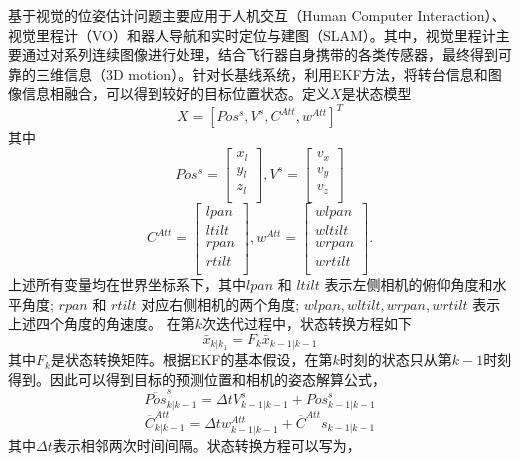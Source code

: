 基于视觉的位姿估计问题主要应用于人机交互（Human Computer Interaction）、视觉里程计（VO）和器人导航和实时定位与建图（SLAM）。其中，视觉里程计主要通过对系列连续图像进行处理，结合飞行器自身携带的各类传感器，最终得到可靠的三维信息（3D motion）。针对长基线系统，利用EKF方法，将转台信息和图像信息相融合，可以得到较好的目标位置状态。定义$X$是状态模型
\begin{equation}
X=[Pos^s, V^s, C^{Att}, w^{Att}]^T
\end{equation}
其中
$$
Pos^s=\left[\begin{array}{c}
x_l\\
y_l\\
z_l\\
\end{array}\right],
V^s=\left[\begin{array}{c}
v_x\\
v_y\\
v_z\\
\end{array}\right]
$$
$$
C^{Att}=\left[\begin{array}{c}
lpan\\
ltilt\\
rpan\\
rtilt\\
\end{array}\right],
w^{Att}=\left[\begin{array}{c}
wlpan\\
wltilt\\
wrpan\\
wrtilt\\
\end{array}\right].
$$
上述所有变量均在世界坐标系下，其中$lpan$ 和 $ltilt$ 表示左侧相机的俯仰角度和水平角度; $rpan$ 和 $rtilt$ 对应右侧相机的两个角度; $wlpan, wltilt, wrpan, wrtilt$ 表示上述四个角度的角速度。
在第$k$次迭代过程中，状态转换方程如下
\begin{equation}
\bar{x}_{k|k_1}=F_k\bar{x}_{k-1|k-1}
\end{equation}
其中$F_k$是状态转换矩阵。根据EKF的基本假设，在第$k$时刻的状态只从第$k-1$时刻得到。因此可以得到目标的预测位置和相机的姿态解算公式，
\begin{equation}
\overline{Pos}^s_{k|k-1}=\Delta t V^s_{k-1|k-1} + {Pos}^s_{k-1|k-1}
\end{equation}
\begin{equation}
\overline{C}^{Att}_{k|k-1}=\Delta t w^{Att}_{k-1|k-1} + \overline{C}^{Att}s_{k-1|k-1}
\end{equation}
其中$\Delta t$表示相邻两次时间间隔。状态转换方程可以写为，
